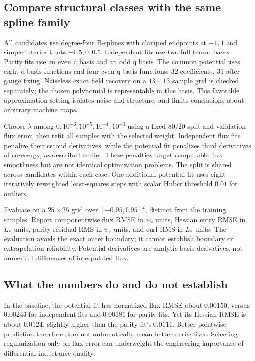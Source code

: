 \subsection{Compare structural classes with the same spline family}
All candidates use degree-four B-splines with clamped endpoints at $-1,1$
and simple interior knots $-0.5,0,0.5$. Independent fits use two full tensor
bases. Parity fits use an even d basis and an odd q basis. The common potential
uses eight d basis functions and four even q basis functions: 32 coefficients,
31 after gauge fixing. Noiseless exact field recovery on a $13\times13$ sample
grid is checked separately; the chosen polynomial is representable in this
basis. This favorable approximation setting isolates noise and structure,
and limits conclusions about arbitrary machine maps.

Choose $\lambda$ among $0,10^{-6},10^{-5},10^{-4},10^{-3}$ using a fixed
80/20 split and validation flux error, then refit all samples with the selected
weight. Independent flux fits penalize their second derivatives, while the
potential fit penalizes third derivatives of co-energy, as described earlier.
These penalties target comparable flux smoothness but are not identical
optimization problems. The split is shared across candidates within each
case. One additional potential fit uses eight iteratively reweighted
least-squares steps with scalar Huber threshold $0.01$ for outliers.

Evaluate on a $25\times25$ grid over $[-0.95,0.95]^2$, distinct from the
training samples. Report componentwise flux RMSE in $\psi_*$ units, Hessian
entry RMSE in $L_*$ units, parity residual RMS in $\psi_*$ units, and curl
RMS in $L_*$ units. The evaluation avoids the exact outer boundary; it cannot
establish boundary or extrapolation reliability. Potential derivatives are
analytic basis derivatives, not numerical differences of interpolated flux.
\begin{table}[tbp]
\centering\scriptsize
\caption{A single seeded illustrative experiment. Independent and parity
fits use flux B-splines; potential fits use co-energy gradients. Structural
zeros hold by construction. This is not an RBF benchmark or a statistical
ranking across many machines and sampling realizations.}
\label{tab:fit-metrics}
\end{table}

\subsection{What the numbers do and do not establish}
In the baseline, the potential fit has normalized flux RMSE about $0.00150$,
versus $0.00243$ for independent fits and $0.00181$ for parity fits.
Yet its Hessian RMSE is about $0.0124$, slightly higher than the parity fit's
$0.0111$. Better pointwise prediction therefore does not automatically mean
better derivatives. Selecting regularization only on flux error can underweight
the engineering importance of differential-inductance quality.

